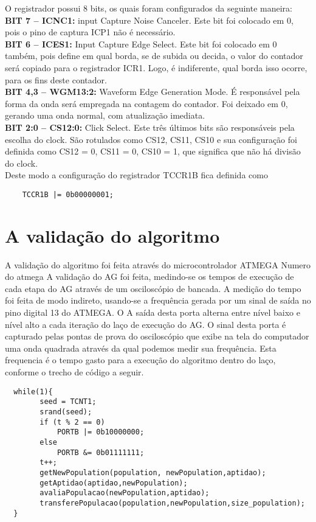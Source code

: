 \documentclass[
    12pt,               %
    twoside,            %
    a4paper,            %
    english,            %
    french,             %
    spanish,            %
    brazil,             %
    ]{abntex2}
\begin{document}
  O registrador possui 8 bits, os quais foram configurados da seguinte maneira:\\
  \textbf{BIT 7 – ICNC1:}  input Capture Noise Canceler. Este bit foi colocado em 0, pois o pino de captura ICP1 não é necessário.\\
  \textbf{BIT 6 – ICES1:} Input Capture Edge Select. Este bit foi colocado em 0 também, pois define em qual borda, se de subida ou decida, o valor do contador será copiado para o registrador ICR1. Logo, é indiferente, qual borda isso ocorre, para os fins deste contador.\\
  \textbf{BIT 4,3 – WGM13:2:} Waveform Edge Generation Mode. É responsável pela forma da onda será empregada na contagem do contador. Foi deixado em 0, gerando uma onda normal, com atualização imediata.\\
  \textbf{BIT 2:0 – CS12:0:} Click Select. Este três últimos bits são responsáveis pela escolha do clock. São rotulados como CS12, CS11, CS10 e sua configuração foi definida como CS12 = 0, CS11 = 0, CS10 = 1, que significa que não há divisão do clock. \\


  Deste modo a configuração do registrador TCCR1B fica definida como 

  \begin{verbatim}
    TCCR1B |= 0b00000001;
  \end{verbatim}

\section{A validação do algoritmo}

  A validação do algoritmo foi feita através do microcontrolador ATMEGA  Numero do atmega
  A validação do AG foi feita, medindo-se os tempos de execução de cada etapa do AG através de um osciloscópio de bancada. A medição do tempo foi feita de modo indireto, usando-se a frequência gerada por um sinal de saída no pino digital 13  do ATMEGA. O A saída desta porta alterna entre nível baixo e nível alto a cada iteração do laço de execução do AG. O sinal desta porta é capturado pelas pontas de prova do osciloscópio que exibe na tela do computador uma onda quadrada através da qual podemos medir sua frequência. Esta frequencia é o tempo gasto para a execução do algoritmo dentro do laço, conforme o trecho de código a seguir.

  \begin{verbatim}
  while(1){  
        seed = TCNT1;
        srand(seed);        
        if (t % 2 == 0)
            PORTB |= 0b10000000;
        else
            PORTB &= 0b01111111; 
        t++;        
        getNewPopulation(population, newPopulation,aptidao);
        getAptidao(aptidao,newPopulation);        
        avaliaPopulacao(newPopulation,aptidao);       
        transferePopulacao(population,newPopulation,size_population);                 
  }
  \end{verbatim}
\end{document}
